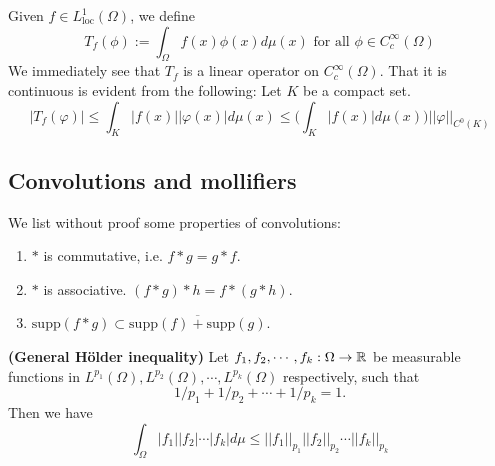 
Given $f\in L^1_{\mathrm{loc}}(\Omega)$, we define \begin{equation}\label{eq:T_f}
    T_f(\phi):=\int_{\Omega} f(x)\phi(x)d\mu(x) \text{ for all }\phi\in C^{\infty}_c(\Omega)
\end{equation}
We immediately see that $T_f$ is a linear operator on $C^{\infty}_c(\Omega)$.
That it is continuous is evident from the following: Let $K$ be a compact set. $$|T_f(\varphi)|\leq \int_K |f(x)||\varphi(x)|d\mu(x)\leq \Big(\int_K |f(x)|d\mu(x)\Big)||\varphi||_{C^0(K)}$$

\subsection{Convolutions and mollifiers}
We list without proof some properties of convolutions: 
\begin{enumerate}
    \item $\ast$ is commutative, i.e. $f\ast g=g\ast f$.
    \item $\ast$ is associative. $(f\ast g)\ast h=f \ast (g\ast h)$.
    \item $\mathrm{supp}(f\ast g)\subset \overline{\mathrm{supp}(f)+\mathrm{supp}(g)}$.
\end{enumerate}
\begin{theorem}\textbf{(General H\"{o}lder inequality)} \label{thm:Holder_for_many_functions}
Let $f_1,f_2,\cdots,f_k:\Omega \to \mathbb{R}$ be measurable functions in $L^{p_1}(\Omega),L^{p_2}(\Omega),\cdots,L^{p_k}(\Omega)$ respectively, such that $$1/p_1+1/p_2+\cdots+1/p_k=1.$$ Then we have $$\int_{\Omega}|f_1||f_2|\cdots|f_k|d\mu \leq ||f_1||_{p_1}||f_2||_{p_2}\cdots||f_k||_{p_k}  $$   
\end{theorem}

